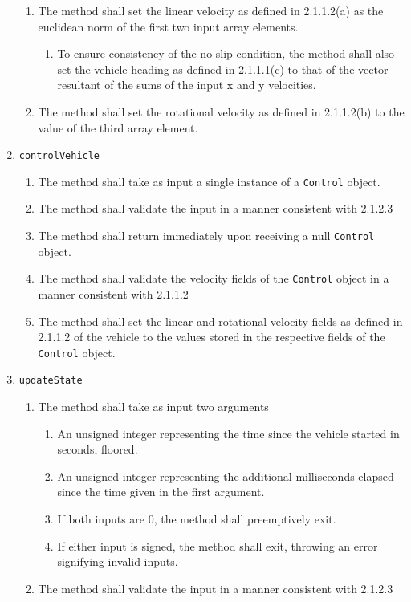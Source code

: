 \documentclass{article}
\begin{document}
\begin{enumerate}
\begin{enumerate}
		\item The method shall set the linear velocity as defined in 2.1.1.2(a) as the euclidean norm of the first two input array elements.
		\begin{enumerate}
			\item To ensure consistency of the no-slip condition, the method shall also set the vehicle heading as defined in 2.1.1.1(c) to that of the vector resultant of the sums of the input x and y velocities.
		\end{enumerate}
		\item The method shall set the rotational velocity as defined in 2.1.1.2(b) to the value of the third array element.
	\end{enumerate}
	\item \verb|controlVehicle|
	\begin{enumerate}
		\item The method shall take as input a single instance of a \verb|Control| object.
		\item The method shall validate the input in a manner consistent with 2.1.2.3
		\item The method shall return immediately upon receiving a null \verb|Control| object.
		\item The method shall validate the velocity fields of the \verb|Control| object in a manner consistent with 2.1.1.2
		\item The method shall set the linear and rotational velocity fields as defined in 2.1.1.2 of the vehicle to the values stored in the respective fields of the \verb|Control| object.
	\end{enumerate}
	\item \verb|updateState|
	\begin{enumerate}
		\item The method shall take as input two arguments
		\begin{enumerate}
			\item An unsigned integer representing the time since the vehicle started in seconds, floored.
			\item An unsigned integer representing the additional milliseconds elapsed since the time given in the first argument.
			\item If both inputs are 0, the method shall preemptively exit.
			\item If either input is signed, the method shall exit, throwing an error signifying invalid inputs.
		\end{enumerate}
		\item The method shall validate the input in a manner consistent with 2.1.2.3

\end{enumerate}
\end{enumerate}
\end{document}
